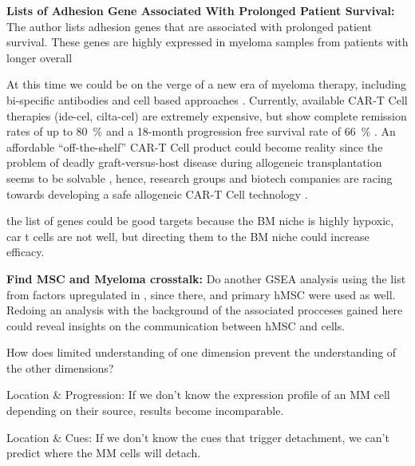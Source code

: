 




\textbf{Lists of Adhesion Gene Associated With Prolonged Patient Survival:}
The author lists adhesion genes that are associated with prolonged patient
survival. These genes are highly expressed in myeloma samples from patients with
longer overall

At this time we could be on the verge of a new era of myeloma therapy,
including bi-specific antibodies and cell based approaches
\cite{moreNovelImmunotherapiesCombinations2023,
      engelhardtFunctionalCureLongterm2024}. Currently, available CAR-T Cell therapies
(ide-cel, cilta-cel) are extremely expensive, but show complete remission rates
of up to \SI{80}{\percent} and a 18-month progression free survival rate of
\SI{66}{\percent} \cite{bobinRecentAdvancesTreatment2022}. An affordable
``off-the-shelf'' CAR-T Cell product could become reality since the problem of
deadly graft-versus-host disease during allogeneic transplantation seems to be
solvable \cite{qasimMolecularRemissionInfant2017}, hence, research groups and
biotech companies are racing towards developing a safe allogeneic CAR-T Cell
technology \cite{depilOfftheshelfAllogeneicCAR2020}.


the list of genes could be good targets because the BM niche is highly hypoxic,
car t cells are not well, but directing them to the BM niche could increase
efficacy.


\textbf{Find MSC and Myeloma crosstalk:}
Do another GSEA analysis using the list from factors upregulated in
\citet{dotterweichContactMyelomaCells2016}, since there, \INA and primary
\ac{hMSC} were used as well. Redoing an analysis with the background of the
associated procceses gained here could reveal insights on the communication
between \ac{hMSC} and \INA cells.



%
\label{sec:discussion_conclusion_cancer}%



How does limited understanding of one dimension prevent the understanding of the
other dimensions?

Location \& Progression: If we don't know the expression profile of an MM cell depending on their
source, results become incomparable.

Location \& Cues: If we don't know the cues that trigger detachment, we can't
predict where the MM cells will detach.



